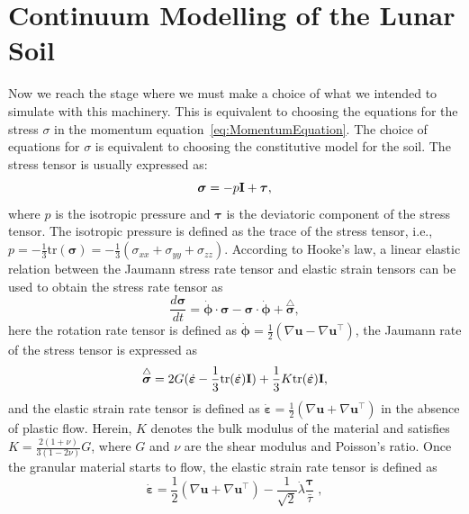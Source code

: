 \documentclass{article}
\begin{document}
\section{Continuum Modelling of the Lunar Soil}
Now we reach the stage where we must make a choice of what we intended to simulate with this machinery. This is equivalent to choosing the equations for the stress $\sigma$ in the momentum equation~\ref{eq:MomentumEquation}. The choice of equations for $\sigma$ is equivalent to choosing the constitutive model for the soil. The stress tensor is usually expressed as:
\begin{equation}\label{equ:stress_tensor}
  \boldsymbol{\sigma} =-p{\bf I}+\boldsymbol{\tau},
\end{equation}
where $p$ is the isotropic pressure and $\boldsymbol{\tau}$ is the deviatoric component of the stress tensor. The isotropic pressure is defined as the trace of the stress tensor, i.e.,  $p=-\frac{1}{3}\mathrm{tr}(\boldsymbol{\sigma}) = -\frac{1}{3}(\sigma_{xx}+\sigma_{yy}+\sigma_{zz})$. According to Hooke's law, a linear elastic relation between the Jaumann stress rate tensor and elastic strain tensors can be used to obtain the stress rate tensor as 
%
\begin{equation}\label{equ:stress_rate}
\frac{d\boldsymbol{\sigma}}{dt} = \dot{\boldsymbol{\phi }}\cdot{\boldsymbol{\sigma}}-{\boldsymbol{\sigma}}\cdot\dot{\boldsymbol{\phi }} + \overset{\triangle}{\boldsymbol{\sigma}},
\end{equation}
here the rotation rate tensor is defined as $\dot{\boldsymbol{\phi }} =\frac{1}{2}(\nabla\textbf{u} - \nabla\textbf{u}^\intercal)$, the Jaumann rate of the stress tensor is expressed as
%
\begin{equation}\label{equ:jaumann}
	\overset{\triangle}{\boldsymbol{\sigma}} =  2G(\dot{\boldsymbol{\varepsilon}}-\frac{1}{3}\mathrm{tr}(\dot{\boldsymbol{\varepsilon}}){\bf I}) + \frac{1}{3}K\mathrm{tr}(\dot{\boldsymbol{\varepsilon}}){\bf I},
\end{equation}
%
and the elastic strain rate tensor is defined as  $\dot{\boldsymbol{\varepsilon}} =\frac{1}{2}(\nabla\textbf{u} + \nabla\textbf{u}^\intercal)$ in the absence of plastic flow. Herein, $K$ denotes the bulk modulus of the material and satisfies $K=\frac{2(1+\nu)}{3(1-2\nu)}G$, where $G$ and $\nu$ are the shear modulus and Poisson’s ratio. Once the granular material starts to flow, the elastic strain rate tensor is defined as 
\[
\dot{\boldsymbol{\varepsilon}} =\frac{1}{2}(\nabla\textbf{u} + \nabla\textbf{u}^\intercal) - \frac{1}{\sqrt{2}}\dot{\lambda} \frac{\boldsymbol{\tau}}{\bar{\tau}} \; ,
\]
\end{document}
